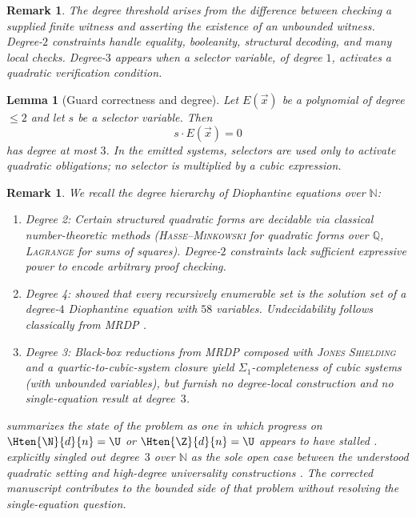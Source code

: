 \documentclass[letterpaper,10pt]{article}
\theoremstyle{upright}
\theoremstyle{upright}
\newtheorem{remark}[theorem]{Remark}
\newtheorem{lemma}[theorem]{Lemma}
\begin{document}
\begin{remark}
	The degree threshold arises from the difference between checking a supplied finite witness and asserting the existence of an unbounded witness. Degree-$2$ constraints handle equality, booleanity, structural decoding, and many local checks. Degree-$3$ appears when a selector variable, of degree $1$, activates a quadratic verification condition.
\end{remark}

\begin{lemma}[Guard correctness and degree]
\label{lem:guard-correctness}
	Let $E(\vec{x})$ be a polynomial of degree $\leq 2$ and let $s$ be a selector variable. Then
	\begin{equation}
		s\cdot E(\vec{x})=0
	\end{equation}
	has degree at most $3$. In the emitted systems, selectors are used only to activate quadratic obligations; no selector is multiplied by a cubic expression.
\end{lemma}

\begin{remark}
	We recall the degree hierarchy of Diophantine equations over $\mathbb{N}$:
	\begin{enumerate}[label=\textnormal{(\roman*)}]
		\item \emph{Degree 2}: Certain structured quadratic forms are decidable via classical number-theoretic methods (\textsc{Hasse--Minkowski} for quadratic forms over $\mathbb{Q}$, \textsc{Lagrange} \citep{lagrange1770} for sums of squares). Degree-$2$ constraints lack sufficient expressive power to encode arbitrary proof checking.
		\item \emph{Degree 4}: \citet{jones80,jones82} showed that every recursively enumerable set is the solution set of a degree-$4$ Diophantine equation with $58$ variables. Undecidability follows classically from \textsc{MRDP} \citep{rdp61,matiyasevich70,davis1973,mrdpbook}.
		\item \emph{Degree 3}: Black-box reductions from \textsc{MRDP} composed with \textsc{Jones Shielding} \citep{jones80} and a quartic-to-cubic-system closure yield $\Sigma_1$-completeness of cubic \emph{systems} (with unbounded variables), but furnish no degree-local construction and no single-equation result at degree~$3$.
	\end{enumerate}
	\citet{gasarch21} summarizes the state of the problem as one in which progress on $\Hten{\N}{d}{n}=\U$ or $\Hten{\Z}{d}{n}=\U$ appears to have stalled \citep{gasarch21}. \citet{jones80} explicitly singled out degree~$3$ over $\mathbb{N}$ as the sole open case between the understood quadratic setting and high-degree universality constructions \citep{jones80}. The corrected manuscript contributes to the bounded side of that problem without resolving the single-equation question.
\end{remark}
\end{document}

